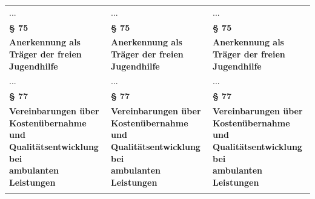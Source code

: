 \documentclass[10pt,a4paper,landscape]{article}
\begin{document}
\begin{longtable}{|L{8.2cm}|L{8.2cm}|L{8.2cm}|}
\hhline{|---|}
... & ... & ... \\
\hhline{|---|}
\textbf{\S{} 75} & \textbf{\S{} 75} & \textbf{\S{} 75} \\
\hhline{|---|}
\textbf{Anerkennung als Träger der freien  \newline Jugendhilfe} & \textbf{Anerkennung als Träger der freien  \newline Jugendhilfe} & \textbf{Anerkennung als Träger der freien  \newline Jugendhilfe} \\
\hhline{|---|}
... & ... & ... \\
\hhline{|---|}
\textbf{\S{} 77} & \textbf{\S{} 77} & \textbf{\S{} 77} \\
\hhline{|---|}
\textbf{Vereinbarungen über Kostenübernahme  \newline und Qualitätsentwicklung bei  \newline ambulanten Leistungen} & \textbf{Vereinbarungen über Kostenübernahme  \newline und Qualitätsentwicklung bei  \newline ambulanten Leistungen} & \textbf{Vereinbarungen über Kostenübernahme  \newline und Qualitätsentwicklung bei  \newline ambulanten Leistungen} \\
\hhline{|---|}

\end{longtable}
\end{document}
